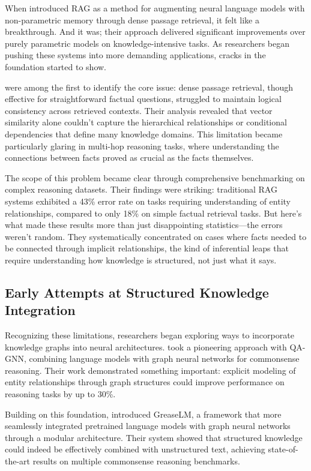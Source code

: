 When \citet{lewis2020retrieval} introduced RAG as a method for augmenting neural language models with non-parametric memory through dense passage retrieval, it felt like a breakthrough. And it was; their approach delivered significant improvements over purely parametric models on knowledge-intensive tasks. As researchers began pushing these systems into more demanding applications, cracks in the foundation started to show.

\citet{karpukhin2020dense} were among the first to identify the core issue: dense passage retrieval, though effective for straightforward factual questions, struggled to maintain logical consistency across retrieved contexts. Their analysis revealed that vector similarity alone couldn't capture the hierarchical relationships or conditional dependencies that define many knowledge domains. This limitation became particularly glaring in multi-hop reasoning tasks, where understanding the connections between facts proved as crucial as the facts themselves.

The scope of this problem became clear through \citet{xiong2021pretrained} comprehensive benchmarking on complex reasoning datasets. Their findings were striking: traditional RAG systems exhibited a 43\% error rate on tasks requiring understanding of entity relationships, compared to only 18\% on simple factual retrieval tasks. But here's what made these results more than just disappointing statistics—the errors weren't random. They systematically concentrated on cases where facts needed to be connected through implicit relationships, the kind of inferential leaps that require understanding how knowledge is structured, not just what it says.

\subsection{Early Attempts at Structured Knowledge Integration}

Recognizing these limitations, researchers began exploring ways to incorporate knowledge graphs into neural architectures. \citet{yasunaga2021qagnn} took a pioneering approach with QA-GNN, combining language models with graph neural networks for commonsense reasoning. Their work demonstrated something important: explicit modeling of entity relationships through graph structures could improve performance on reasoning tasks by up to 30\%.

Building on this foundation, \citet{zhang2022grease} introduced GreaseLM, a framework that more seamlessly integrated pretrained language models with graph neural networks through a modular architecture. Their system showed that structured knowledge could indeed be effectively combined with unstructured text, achieving state-of-the-art results on multiple commonsense reasoning benchmarks.

